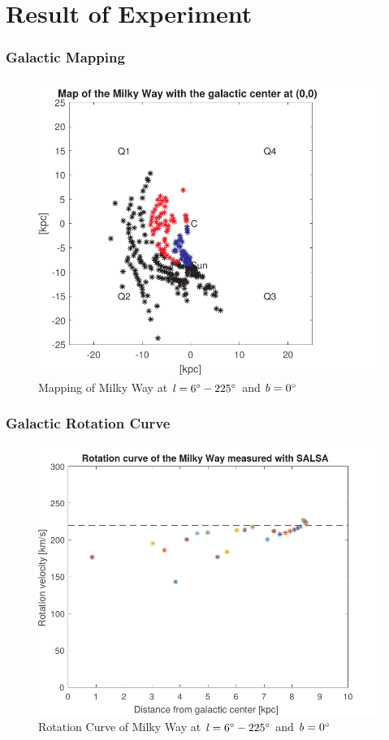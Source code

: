 \documentclass{beamer}
\begin{document}


\section{Result of Experiment}


\begin{frame}
\frametitle{Galactic Mapping}
\begin{figure}
\caption{Mapping of Milky Way at $\mathit{l}=6\degree-225\degree$ and $\mathit{b}=0\degree$}
\includegraphics[width=0.6\linewidth]{map_1}
\end{figure}
\end{frame}


\begin{frame}
\frametitle{Galactic Rotation Curve}
\begin{figure}
\caption{Rotation Curve of Milky Way at $\mathit{l}=6\degree-225\degree$ and $\mathit{b}=0\degree$}
\includegraphics[width=0.6\linewidth]{rotationcurve_1}
\end{figure}
\end{frame}
\end{document}
